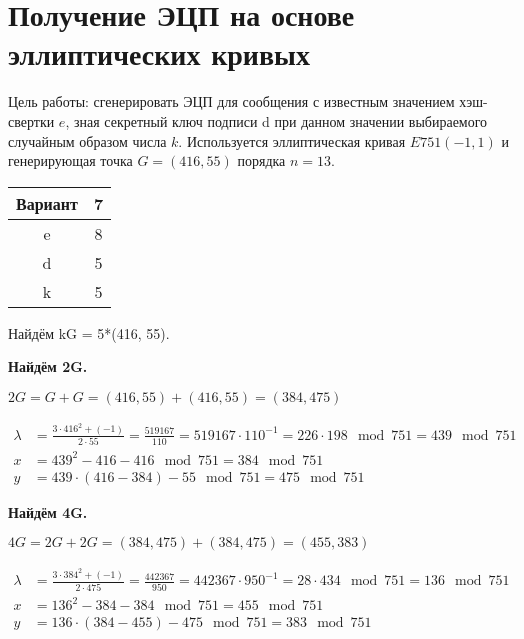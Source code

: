 \section{Получение ЭЦП на основе эллиптических кривых}

Цель работы: сгенерировать ЭЦП для сообщения с известным значением хэш-свертки $e$, зная секретный ключ подписи d при данном значении выбираемого случайным образом числа $k$. Используется эллиптическая кривая $E751(−1,1)$ и генерирующая точка $G = (416, 55)$ порядка $n =13$.

\begin{table}[H]
	\centering
	\begin{tabular}{|c|c|}
		\hline 
		Вариант & 7 \\ 
		\hline 
		e & 8 \\ 
		\hline 
		d & 5 \\ 
		\hline 
		k & 5 \\ 
		\hline 
	\end{tabular} 
\end{table}

Найдём kG = 5*(416, 55).


\textbf{Найдём 2G.}


$2G = G + G = (416, 55) + (416, 55) = (384, 475)$

\begin{equation*}
	\begin{aligned}
		\lambda &= \frac{ 3 \cdot 416^2 + (-1) }{2 \cdot 55} = \frac{519167}{110} = 519167 \cdot 110^{-1} = 226 \cdot 198\mod{751} = 439\mod{751} \\
		x &= 439^2 - 416 - 416 \mod{751} = 384\mod{751} \\
		y &= 439 \cdot (416 - 384) - 55\mod{751} = 475\mod{751}
	\end{aligned}
\end{equation*}

\textbf{Найдём 4G.}


$4G = 2G + 2G = (384, 475) + (384, 475) = (455, 383)$

\begin{equation*}
	\begin{aligned}
		\lambda &= \frac{ 3 \cdot 384^2 + (-1) }{2 \cdot 475} = \frac{442367}{950} = 442367 \cdot 950^{-1} = 28 \cdot 434\mod{751} = 136\mod{751} \\
		x &= 136^2 - 384 - 384 \mod{751} = 455\mod{751} \\
		y &= 136 \cdot (384 - 455) - 475\mod{751} = 383\mod{751}
	\end{aligned}
\end{equation*}

